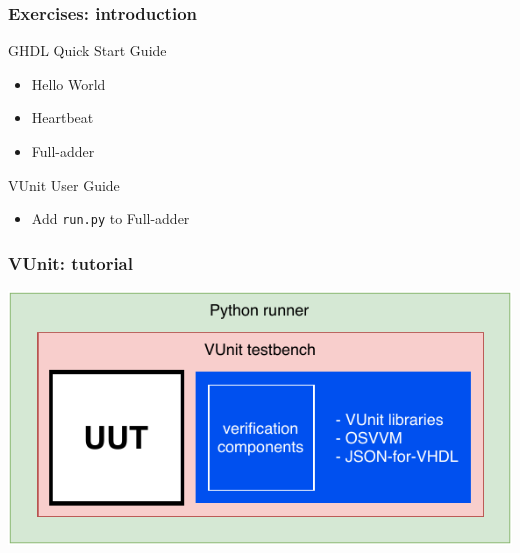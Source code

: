 \documentclass{beamer}
\begin{document}
\begin{frame}
\frametitle{Exercises: introduction}
GHDL Quick Start Guide \href{https://ghdl.readthedocs.io/en/latest/examples/quick_start/README.html}{\faBook}
\vspace{1em}
\begin{itemize}
  \item Hello World
  \href{https://ghdl.readthedocs.io/en/latest/examples/quick_start/hello/README.html}{\faBook}
  \vspace{1em}

  \item Heartbeat
  \href{https://ghdl.readthedocs.io/en/latest/examples/quick_start/heartbeat/README.html}{\faBook}
  \vspace{1em}

  \item Full-adder
  \href{https://ghdl.readthedocs.io/en/latest/examples/quick_start/adder/README.html}{\faBook}
\end{itemize}
\vspace{2em}

VUnit User Guide \href{http://vunit.github.io/user_guide.html}{\faBook}
\vspace{1em}
\begin{itemize}
  \item Add \lstinline{run.py} to Full-adder
\end{itemize}
\end{frame}

\begin{frame}
\frametitle{VUnit: tutorial}
\centering
\includegraphics[width=\linewidth]{vunit.pdf}
\end{frame}
\end{document}
